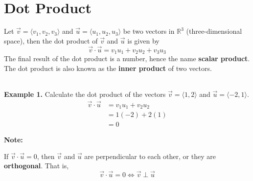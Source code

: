 \chapter{Dot Product}

Let $\vec{v} = \langle v_1, v_2, v_3 \rangle$ and $\vec{u} = \langle u_1, u_2,
    u_3 \rangle$ be two vectors in $\mathbb{R}^3$ (three-dimensional space), then
the dot product of $\vec{v}$ and $\vec{u}$ is given by \[\vec{v} \cdot \vec{u} = v_1u_1 + v_2u_2 + v_3u_3\]
The final result of the dot product is a number, hence the name \textbf{scalar
    product}. The dot product is also known as the \textbf{inner product} of two
vectors.

~\\ \noindent\textbf{Example 1. } Calculate the dot product of the
vectors $\vec{v} = \langle 1, 2 \rangle$ and $\vec{u} = \langle -2, 1 \rangle$.
\begin{align*}
    \vec{v} \cdot \vec{u} & = v_1u_1 + v_2u_2 \\
                          & = 1(-2) + 2(1)    \\
                          & = 0
\end{align*}
\begin{framed}
    \noindent\textbf{Note: }

    \noindent If $\vec{v} \cdot \vec{u} = 0$, then $\vec{v}$ and $\vec{u}$ are perpendicular to each other, or they are \textbf{orthogonal}. That is,
    \[\vec{v} \cdot \vec{u} = 0 \Longleftrightarrow \vec{v} \perp \vec{u}\]
\end{framed}
\newpage
